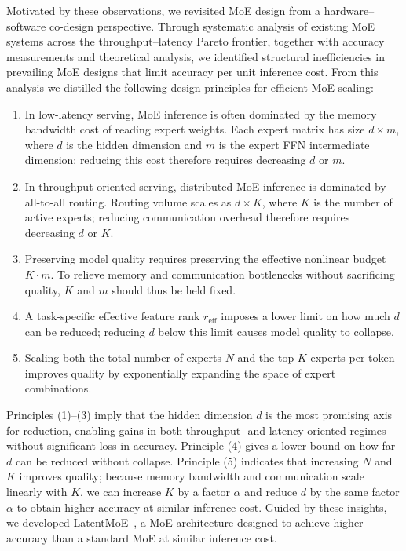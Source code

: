 Motivated by these observations, we revisited MoE design from a hardware--software co-design perspective.
Through systematic analysis of existing MoE systems across the throughput--latency Pareto frontier, together with accuracy measurements and theoretical analysis, we identified structural inefficiencies in prevailing MoE designs that limit accuracy per unit inference cost.
From this analysis we distilled the following design principles for efficient MoE scaling:
\begin{enumerate}
    \setlength{\itemsep}{0.4em}
    \item In low-latency serving, MoE inference is often dominated by the memory bandwidth cost of reading expert weights. Each expert matrix has size $d \times m$, where $d$ is the hidden dimension and $m$ is the expert FFN intermediate dimension; reducing this cost therefore requires decreasing $d$ or $m$.
    \item In throughput-oriented serving, distributed MoE inference is dominated by all-to-all routing. Routing volume scales as $d \times K$, where $K$ is the number of active experts; reducing communication overhead therefore requires decreasing $d$ or $K$.
    \item Preserving model quality requires preserving the effective nonlinear budget $K \cdot m$. To relieve memory and communication bottlenecks without sacrificing quality, $K$ and $m$ should thus be held fixed.
    \item A task-specific effective feature rank $r_{\mathrm{eff}}$ imposes a lower limit on how much $d$ can be reduced; reducing $d$ below this limit causes model quality to collapse.
    \item Scaling both the total number of experts $N$ and the top-$K$ experts per token improves quality by exponentially expanding the space of expert combinations.
\end{enumerate}
Principles (1)--(3) imply that the hidden dimension $d$ is the most promising axis for reduction, enabling gains in both throughput- and latency-oriented regimes without significant loss in accuracy.
Principle (4) gives a lower bound on how far $d$ can be reduced without collapse.
Principle (5) indicates that increasing $N$ and $K$ improves quality; because memory bandwidth and communication scale linearly with $K$, we can increase $K$ by a factor $\alpha$ and reduce $d$ by the same factor $\alpha$ to obtain higher accuracy at similar inference cost.
Guided by these insights, we developed LatentMoE~\citep{latentmoe_tr}, a MoE architecture designed to achieve higher accuracy than a standard MoE at similar inference cost.


